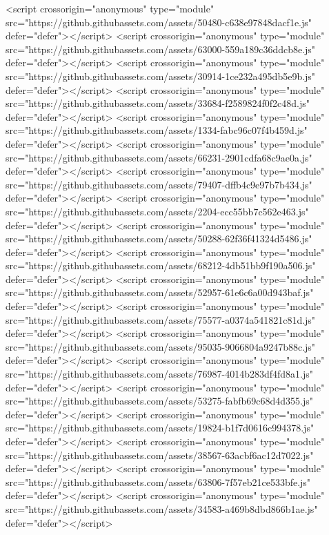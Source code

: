 <script crossorigin="anonymous" type="module" src="https://github.githubassets.com/assets/50480-c638e97848dacf1e.js" defer="defer"></script>
<script crossorigin="anonymous" type="module" src="https://github.githubassets.com/assets/63000-559a189c36ddcb8e.js" defer="defer"></script>
<script crossorigin="anonymous" type="module" src="https://github.githubassets.com/assets/30914-1ce232a495db5e9b.js" defer="defer"></script>
<script crossorigin="anonymous" type="module" src="https://github.githubassets.com/assets/33684-f2589824f0f2c48d.js" defer="defer"></script>
<script crossorigin="anonymous" type="module" src="https://github.githubassets.com/assets/1334-fabc96c07f4b459d.js" defer="defer"></script>
<script crossorigin="anonymous" type="module" src="https://github.githubassets.com/assets/66231-2901cdfa68c9ae0a.js" defer="defer"></script>
<script crossorigin="anonymous" type="module" src="https://github.githubassets.com/assets/79407-dffb4c9e97b7b434.js" defer="defer"></script>
<script crossorigin="anonymous" type="module" src="https://github.githubassets.com/assets/2204-ecc55bb7c562e463.js" defer="defer"></script>
<script crossorigin="anonymous" type="module" src="https://github.githubassets.com/assets/50288-62f36f41324d5486.js" defer="defer"></script>
<script crossorigin="anonymous" type="module" src="https://github.githubassets.com/assets/68212-4db51bb9f190a506.js" defer="defer"></script>
<script crossorigin="anonymous" type="module" src="https://github.githubassets.com/assets/52957-61e6c6a00d943baf.js" defer="defer"></script>
<script crossorigin="anonymous" type="module" src="https://github.githubassets.com/assets/75577-a0374a541821c81d.js" defer="defer"></script>
<script crossorigin="anonymous" type="module" src="https://github.githubassets.com/assets/95035-9066804a9247b88c.js" defer="defer"></script>
<script crossorigin="anonymous" type="module" src="https://github.githubassets.com/assets/76987-4014b283df4fd8a1.js" defer="defer"></script>
<script crossorigin="anonymous" type="module" src="https://github.githubassets.com/assets/53275-fabfb69c68d4d355.js" defer="defer"></script>
<script crossorigin="anonymous" type="module" src="https://github.githubassets.com/assets/19824-b1f7d0616c994378.js" defer="defer"></script>
<script crossorigin="anonymous" type="module" src="https://github.githubassets.com/assets/38567-63acbf6ac12d7022.js" defer="defer"></script>
<script crossorigin="anonymous" type="module" src="https://github.githubassets.com/assets/63806-7f57eb21ce533bfe.js" defer="defer"></script>
<script crossorigin="anonymous" type="module" src="https://github.githubassets.com/assets/34583-a469b8dbd866b1ae.js" defer="defer"></script>

